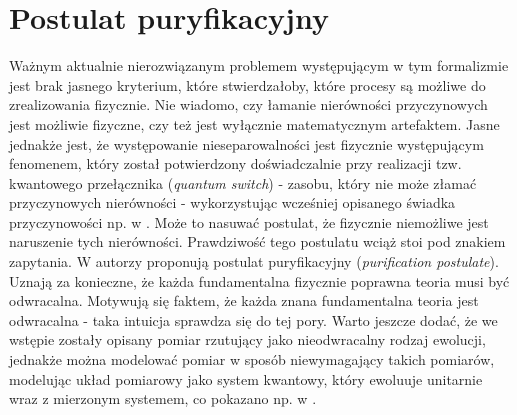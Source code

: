 \documentclass[10pt]{article} %
\begin{document}
\section{Postulat puryfikacyjny}
Ważnym aktualnie nierozwiązanym problemem występującym w tym formalizmie jest brak jasnego kryterium, które stwierdzałoby, które procesy są możliwe do zrealizowania fizycznie.
Nie wiadomo, czy łamanie nierówności przyczynowych jest możliwie fizyczne, czy też jest wyłącznie matematycznym artefaktem. Jasne jednakże jest, że występowanie nieseparowalności jest fizycznie występującym fenomenem, który został potwierdzony doświadczalnie przy realizacji tzw. 
kwantowego przełącznika (\textit{quantum switch}) - zasobu, który nie może złamać przyczynowych nierówności - wykorzystując wcześniej opisanego świadka przyczynowości np. w \cite{experiment}. Może to nasuwać postulat, że fizycznie niemożliwe jest naruszenie tych nierówności. Prawdziwość tego postulatu wciąż stoi pod znakiem zapytania. W \cite{purification} autorzy proponują postulat puryfikacyjny (\textit{purification postulate}). Uznają za konieczne, że każda fundamentalna fizycznie poprawna teoria
musi być odwracalna. Motywują się faktem, że każda znana fundamentalna teoria jest odwracalna - taka intuicja sprawdza się do tej pory.
Warto jeszcze dodać, że we wstępie zostały opisany pomiar rzutujący jako nieodwracalny rodzaj ewolucji, jednakże można modelować pomiar w sposób niewymagający takich pomiarów, modelując układ pomiarowy jako system kwantowy, który ewoluuje unitarnie wraz z mierzonym systemem, co pokazano np. w
\cite{reversible}. 
\end{document}
